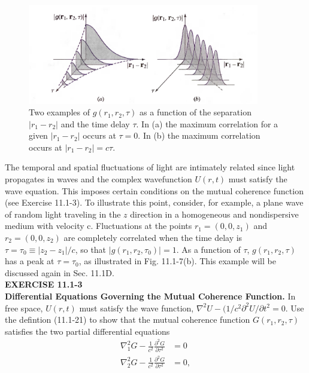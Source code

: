 \documentclass{article}
\newcommand\crule[3][black]{\textcolor{#1}{\rule{#2}{#3}}}
\numberwithin{figure}{subsection}
\numberwithin{table}{subsection}
\begin{document}
\begin{figure}[H]
\centering
\includegraphics[width=0.9\textwidth]{11_1_7.PNG}
\caption{Two examples of $ g(r_1, r_2, \tau) $ as a function of the separation $ \lvert r_1 - r_2 \rvert $ and the time delay $ \tau $. In (a) the maximum correlation for a given $ \lvert r_1 - r_2 \rvert $ occurs at $ \tau = 0 $. In (b) the maximum correlation occurs at $ \lvert r_1 - r_2 \rvert = c \tau $. }
\label{fig: 11_1_7}
\end{figure}
\par The temporal and spatial fluctuations of  light are intimately related since light propagates in waves and the complex wavefunction $ U(r,t) $ must satisfy the wave equation. This imposes certain conditions on the mutual coherence function (see Exercise 11.1-3). To illustrate this point, consider, for example, a plane wave of random light traveling in the $ z $ direction in a homogeneous and nondispersive medium with velocity c. Fluctuations at the points $ r_1 = (0, 0, z_1) $ and $ r_2 = (0, 0, z_2) $ are completely correlated when the time delay is $ \tau = \tau_0 \equiv \lvert z_2 - z_1 \rvert /c $, so that $ \lvert g(r_1, r_2, \tau_0) \rvert = 1 $. As a function of $ \tau $, $ g(r_1, r_2, \tau) $ has a  peak at $ \tau = \tau_0 $, as illustrated in Fig. 11.1-7(b). This example will be discussed again in Sec. 11.1D.\\
\noindent{\crule[ksc]{\textwidth}{0.2cm}}
\textbf{EXERCISE 11.1-3} \\
\textbf{Differential Equations Governing the Mutual Coherence Function.} In free space, $ U(r,t) $ must satisfy the wave function, $ \nabla^2 U - (1/c^2  \partial^2 U / \partial t^2 = 0 $. Use the defintion (11.1-21) to show that the mutual coherence function $ G(r_1, r_2, \tau) $ satisfies the two partial differential equations
\begin{subequations}
\begin{align}
\nabla_1^2 G - \frac{1}{c^2} \frac{\partial^2 G}{\partial \tau^2}  &= 0\\
\nabla_2^2 G - \frac{1}{c^2} \frac{\partial^2 G}{\partial \tau^2 } &= 0,
\end{align}
\end{subequations} 
\end{document}
